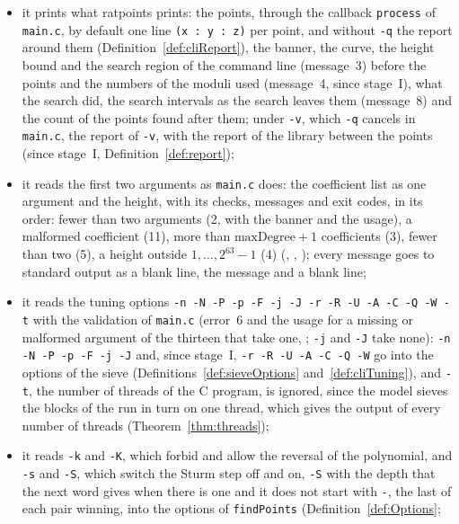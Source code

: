 \begin{itemize}
  \item it prints what ratpoints prints: the points, through the callback \verb|process| of
    \verb|main.c|, by default one line \verb|(x : y : z)| per point, and without \verb|-q| the
    report around them (Definition~\ref{def:cliReport}), the banner, the curve, the height bound and
    the search region of the command line (message~3) before the points and the numbers of the
    moduli used (message~4, since stage~I), what the search did, the search intervals as the search
    leaves them (message~8) and the count of the points found after them; under
    \verb|-v|, which \verb|-q| cancels in \verb|main.c|, the report of \verb|-v|, with the report of
    the library between the points (since stage~I, Definition~\ref{def:report});
  \item it reads the first two arguments as \verb|main.c| does: the coefficient list as one argument
    and the height, with its checks, messages and exit codes, in its order: fewer than two arguments
    (2, with the banner and the usage), a malformed coefficient (11), more than $\mathrm{maxDegree}
    + 1$ coefficients (3), fewer than two (5), a height outside $1, \dots, 2^{63} - 1$ (4)
    (, , ); every
    message goes to standard output as a blank line, the message and a blank line;
  \item it reads the tuning options \verb|-n -N -P -p -F -j -J -r -R -U -A -C -Q -W -t| with the
    validation of \verb|main.c| (error~6 and the usage for a missing or malformed argument of the
    thirteen that take one, ; \verb|-j| and \verb|-J| take none):
    \verb|-n -N -P -p -F -j -J| and, since stage~I, \verb|-r -R -U -A -C -Q -W| go into the options
    of the sieve (Definitions~\ref{def:sieveOptions} and~\ref{def:cliTuning}), and \verb|-t|, the
    number of threads of the C program, is ignored, since the model sieves the blocks of the run in
    turn on one thread, which gives the output of every number of threads
    (Theorem~\ref{thm:threads});
  \item it reads \verb|-k| and \verb|-K|, which forbid and allow the reversal of the polynomial,
    and \verb|-s| and \verb|-S|, which switch the Sturm step off and on, \verb|-S| with the depth
    that the next word gives when there is one and it does not start with \verb|-|, the last of
    each pair winning, into the options of \verb|findPoints| (Definition~\ref{def:Options};

\end{itemize}
